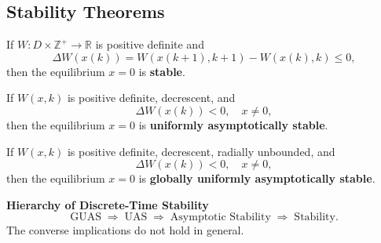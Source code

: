 \subsection{Stability Theorems}

\begin{theorem}
If $W:D \times \mathbb{Z}^+ \to \mathbb{R}$ is positive definite and
\[
\Delta W(x(k)) = W(x(k+1),k+1) - W(x(k),k) \le 0,
\]
then the equilibrium $x=0$ is \textbf{stable}.
\end{theorem}

\begin{theorem}
If $W(x,k)$ is positive definite, decrescent, and
\[
\Delta W(x(k)) < 0, \quad x\neq 0,
\]
then the equilibrium $x=0$ is \textbf{uniformly asymptotically stable}.
\end{theorem}

\begin{theorem}
If $W(x,k)$ is positive definite, decrescent, radially unbounded, and
\[
\Delta W(x(k)) < 0, \quad x\neq 0,
\]
then the equilibrium $x=0$ is \textbf{globally uniformly asymptotically stable}.
\end{theorem}

\begin{remark}\textbf{Hierarchy of Discrete-Time Stability}
\[
\text{GUAS} \;\Rightarrow\; \text{UAS} \;\Rightarrow\; \text{Asymptotic Stability} \;\Rightarrow\; \text{Stability}.
\]
The converse implications do not hold in general.
\end{remark}
